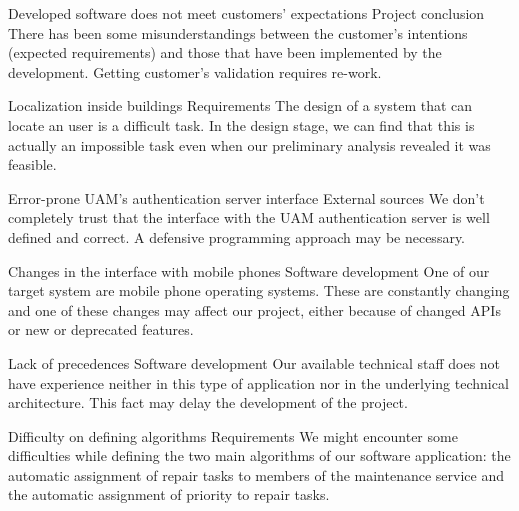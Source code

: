 \begin{risk}{Developed software does not meet customers' expectations}
\label{riskExpectations}
\riskcat Project conclusion
\riskdesc There has been some misunderstandings between the customer's intentions (expected requirements) and those that have been implemented by the development. Getting customer's validation requires re-work.
\end{risk}

\begin{risk}{Localization inside buildings}
\label{riskLocalization}
\riskcat Requirements
\riskdesc The design of a system that can locate an user is a difficult task. In the design stage, we can find that this is actually an impossible task even when our preliminary analysis revealed it was feasible.
\end{risk}

\begin{risk}{Error-prone UAM's authentication server interface}
\label{riskAuthServer}
\riskcat External sources
\riskdesc We don't completely trust that the interface with the UAM authentication server is well defined and correct. A defensive programming approach may be necessary.
\end{risk}

\begin{risk}{Changes in the interface with mobile phones}
\label{riskPhone}
\riskcat Software development
\riskdesc One of our target system are mobile phone operating systems. These are constantly changing and one of these changes may affect our project, either because of changed APIs or new or deprecated features.
\end{risk}

\begin{risk}{Lack of precedences}
\label{riskPrec}
\riskcat Software development
\riskdesc Our available technical staff does not have experience neither in this type of application nor in the underlying technical architecture. This fact may delay the development of the project.
\end{risk}

\begin{risk}{Difficulty on defining algorithms}
\label{riskAlgorithms}
\riskcat Requirements
\riskdesc We might encounter some difficulties while defining the two main algorithms of our software application: the automatic assignment of repair tasks to members of the maintenance service and the automatic assignment of priority to repair tasks.
\end{risk}


